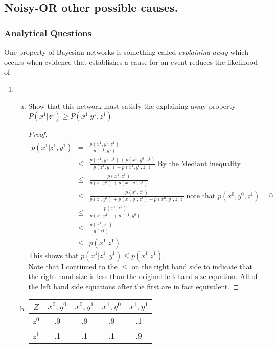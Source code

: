 \documentclass[12pt]{article}
\begin{document}
\subsection{Noisy-OR  other possible causes.}
	\subsubsection{Analytical Questions}
	One property of Bayesian networks is something called \textit{explaining away }which occurs when
evidence that establishes a cause for an event reduces the likelihood of
		\begin{enumerate}
			\item	
				\begin{enumerate}[(a)]
					\item Show that this network must satisfy the explaining-away property $P(x^1|z^1) \geq P(x^1|y^1,z^1)$
					\begin{proof}
					\begin{eqnarray*}
						p(x^1|z^1,y^1) &=& \frac{p(x^1,y^1,z^1)}{p(z^1,y^1)} \\
												&\leq & \frac{p(x^1,y^1,z^1) + p(x^1,y^0,z^1)}{p(z^1,y^1) + p(x^1,y^0,z^1)}\; \text{By the Mediant inequality} \\
												&\leq & \frac{p(x^1,z^1)}{p(z^1,y^1) + p(x^1,y^0,z^1)} \\
												&\leq & \frac{p(x^1,z^1)}{p(z^1,y^1) + p(x^1,y^0,z^1) + p(x^0,y^0,z^1)}\; \text{note that } p(x^0,y^0,z^1) = 0 \\
												&\leq & \frac{p(x^1,z^1)}{p(z^1,y^1) + p(z^1,y^0)} \\
												&\leq & \frac{p(x^1,z^1)}{p(z^1)} \\
												&\leq & p(x^1|z^1)
					\end{eqnarray*}
					This shows that $p(x^1|z^1,y^1) \leq p(x^1|z^1)$. \\
					Note that I continued to the $\leq$ on the right hand side to indicate that the right hand size is less than the original left hand size equation. All of the left hand side equations after the first are in fact equivalent. 
					\end{proof}
						\item 
							\begin{tabular}{c||c c c c}
								$Z$ & $x^0,y^0$ & $x^0,y^1$ & $x^1,y^0$ & $x^1,y^1$  \\ \hline
								$z^0$ & .9 & .9 & .9 &  .1 \\
								$z^1$ & .1  & .1 & .1 & .9
							\end{tabular} \\
							

\end{enumerate}
\end{enumerate}
\end{document}
